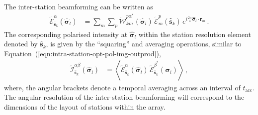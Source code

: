 \documentclass[
  journal=pasa,
  manuscript=article-type,
  year=2020,
  volume=37,
]{cup-journal}
\begin{document}
The inter-station beamforming 
can be written as
\begin{align}
    \widetilde{\mathcal{E}}_{\hat{\boldsymbol{s}}_k}^\alpha(\hat{\boldsymbol{\sigma}}_l) &= \sum_{m} \sum_p  \widetilde{\mathcal{W}}_{km}^{{p\alpha}^*}(\hat{\boldsymbol{\sigma}}_l) \, \widetilde{\mathcal{E}}_m^p(\hat{\boldsymbol{s}}_k) \, e^{i\frac{2\pi}{\lambda} \hat{\boldsymbol{\sigma}}_l\cdot\boldsymbol{r}_{m}} \, . \label{eqn:inter-station-pol-hol-img-expl}    
\end{align}
The corresponding polarised intensity at $\hat{\boldsymbol{\sigma}}_l$ within the station resolution element denoted by $\hat{\boldsymbol{s}}_k$, is given by the ``squaring'' and averaging operations, similar to Equation~(\ref{eqn:intra-station-opt-pol-img-outprod}),
\begin{align}
    \widetilde{\mathcal{I}}^{\alpha\beta}_{\hat{\boldsymbol{s}}_k}(\hat{\boldsymbol{\sigma}}_l) &= \left\langle \widetilde{\mathcal{E}}_{\hat{\boldsymbol{s}}_k}^\alpha(\hat{\boldsymbol{\sigma}}_l) \,  \widetilde{\mathcal{E}}_{\hat{\boldsymbol{s}}_k}^{\beta^*}(\hat{\boldsymbol{\sigma}}_l) \right\rangle \, , \label{eqn:inter-station-opt-pol-img-outprod}
\end{align}
where, the angular brackets denote a temporal averaging across an interval of $t_\textrm{acc}$. The angular resolution of the inter-station beamforming will correspond to the dimensions of the layout of stations within the array.

\end{document}
